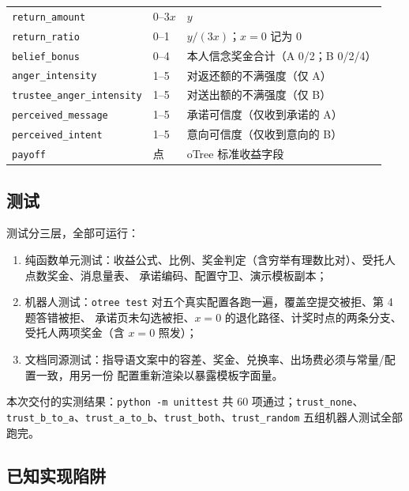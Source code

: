 \documentclass[10pt,a4paper]{ctexart}
\newcommand{\code}[1]{\texttt{#1}}
\begin{document}
\begin{longtable}{p{5.4cm}p{2.9cm}p{5.5cm}}
\code{return\_amount} & 0--$3x$ & $y$ \\
\code{return\_ratio} & 0--1 & $y/(3x)$；$x=0$ 记为 0 \\
\code{belief\_bonus} & 0--4 & 本人信念奖金合计（A 0/2；B 0/2/4） \\
\code{anger\_intensity} & 1--5 & 对返还额的不满强度（仅 A） \\
\code{trustee\_anger\_intensity} & 1--5 & 对送出额的不满强度（仅 B） \\
\code{perceived\_message} & 1--5 & 承诺可信度（仅收到承诺的 A） \\
\code{perceived\_intent} & 1--5 & 意向可信度（仅收到意向的 B） \\
\code{payoff} & 点 & oTree 标准收益字段 \\
\bottomrule
\end{longtable}

\subsection{测试}

测试分三层，全部可运行：

\begin{enumerate}
  \item 纯函数单元测试：收益公式、比例、奖金判定（含穷举有理数比对）、受托人点数奖金、消息量表、
        承诺编码、配置守卫、演示模板副本；
  \item 机器人测试：\code{otree test} 对五个真实配置各跑一遍，覆盖空提交被拒、第 4 题答错被拒、
        承诺页未勾选被拒、$x=0$ 的退化路径、计奖时点的两条分支、受托人两项奖金（含 $x=0$ 照发）；
  \item 文档同源测试：指导语文案中的容差、奖金、兑换率、出场费必须与常量/配置一致，用另一份
        配置重新渲染以暴露模板字面量。
\end{enumerate}

本次交付的实测结果：\code{python -m unittest} 共 60 项通过；\code{trust\_none}、
\code{trust\_b\_to\_a}、\code{trust\_a\_to\_b}、\code{trust\_both}、\code{trust\_random}
五组机器人测试全部跑完。

\subsection{已知实现陷阱}
\end{document}
